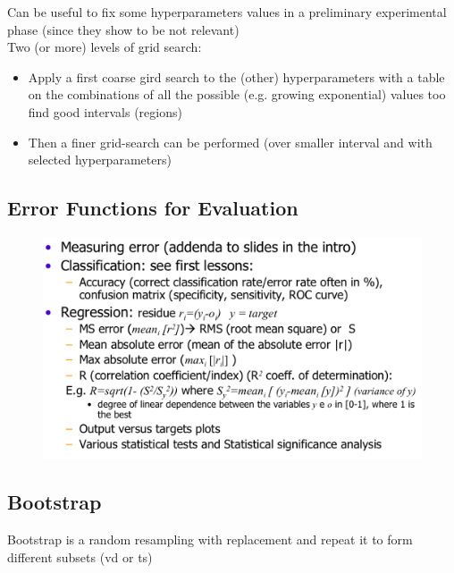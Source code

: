 \documentclass[../main.tex]{subfiles}
\begin{document}
Can be useful to fix some hyperparameters values in a preliminary experimental phase (since they show to be not relevant)\\

Two (or more) levels of grid search:

\begin{itemize}
    \item Apply a first coarse gird search to the (other) hyperparameters with a table on the combinations of all the possible (e.g. growing exponential) values too find good intervals (regions)

    \item Then a finer grid-search can be performed (over smaller interval and
with selected hyperparameters)
\end{itemize}

\subsection{Error Functions for Evaluation}
\begin{figure}[H]
    \centering
    \includegraphics[scale = 0.30]{lectures/5_validation/5_error_function.png}
\end{figure}

\subsection{Bootstrap}
Bootstrap is a random resampling with replacement and repeat it to form different subsets (vd or ts)
\end{document}
